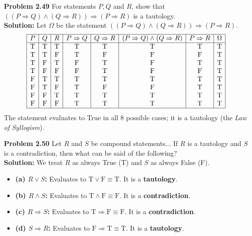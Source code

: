 \documentclass{article}
\begin{document}
\vspace{1em}
\textbf{Problem 2.49} For statements $P, Q$ and $R$, show that $((P \Rightarrow Q) \land (Q \Rightarrow R)) \Rightarrow (P \Rightarrow R)$ is a tautology.
\\[0.5em]
\textbf{Solution:} Let $\Omega$ be the statement $((P \Rightarrow Q) \land (Q \Rightarrow R)) \Rightarrow (P \Rightarrow R)$.
\[
\begin{array}{|c|c|c|c|c|c|c|c|}
\hline
P & Q & R & P \Rightarrow Q & Q \Rightarrow R & (P \Rightarrow Q) \land (Q \Rightarrow R) & P \Rightarrow R & \Omega \\
\hline
\text{T} & \text{T} & \text{T} & \text{T} & \text{T} & \text{T} & \text{T} & \text{T} \\
\text{T} & \text{T} & \text{F} & \text{T} & \text{F} & \text{F} & \text{F} & \text{T} \\
\text{T} & \text{F} & \text{T} & \text{F} & \text{T} & \text{F} & \text{T} & \text{T} \\
\text{T} & \text{F} & \text{F} & \text{F} & \text{T} & \text{F} & \text{F} & \text{T} \\
\text{F} & \text{T} & \text{T} & \text{T} & \text{T} & \text{T} & \text{T} & \text{T} \\
\text{F} & \text{T} & \text{F} & \text{T} & \text{F} & \text{F} & \text{T} & \text{T} \\
\text{F} & \text{F} & \text{T} & \text{T} & \text{T} & \text{T} & \text{T} & \text{T} \\
\text{F} & \text{F} & \text{F} & \text{T} & \text{T} & \text{T} & \text{T} & \text{T} \\
\hline
\end{array}
\]
The statement evaluates to True in all 8 possible cases; it is a tautology (the \textit{Law of Syllogism}).

\vspace{1em}
\textbf{Problem 2.50} Let $R$ and $S$ be compound statements... If $R$ is a tautology and $S$ is a contradiction, then what can be said of the following?
\\[0.5em]
\textbf{Solution:} We treat $R$ as always True (T) and $S$ as always False (F).
\begin{itemize}
    \item \textbf{(a) $R \lor S$:} Evaluates to $\text{T} \lor \text{F} \equiv \text{T}$. It is a \textbf{tautology}.
    \item \textbf{(b) $R \land S$:} Evaluates to $\text{T} \land \text{F} \equiv \text{F}$. It is a \textbf{contradiction}.
    \item \textbf{(c) $R \Rightarrow S$:} Evaluates to $\text{T} \Rightarrow \text{F} \equiv \text{F}$. It is a \textbf{contradiction}.
    \item \textbf{(d) $S \Rightarrow R$:} Evaluates to $\text{F} \Rightarrow \text{T} \equiv \text{T}$. It is a \textbf{tautology}.
\end{itemize}
\end{document}
